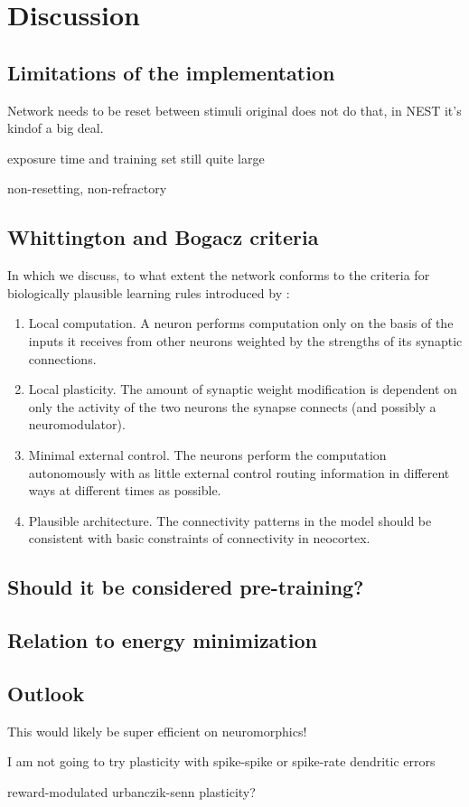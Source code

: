 
\chapter{Discussion}


\section{Limitations of the implementation}

Network needs to be reset between stimuli
original does not do that, in NEST it's kindof a big deal.

exposure time and training set still quite large

non-resetting, non-refractory


\section{Whittington and Bogacz criteria}

In which we discuss, to what extent the network conforms to the criteria for biologically plausible learning rules
introduced by \cite{Whittington2017}:
\begin{enumerate}
    \item Local computation. A neuron performs computation only on the basis
          of the inputs it receives from other neurons weighted by the strengths
          of its synaptic connections.
    \item  Local plasticity. The amount of synaptic weight modification is dependent on only the activity of the two
          neurons the synapse connects (and possibly a neuromodulator).
    \item  Minimal external control. The neurons perform the computation autonomously with as little external control
          routing information in different ways at different times as possible.
    \item   Plausible architecture. The connectivity patterns in the model should
          be consistent with basic constraints of connectivity in neocortex.
\end{enumerate}

\section{Should it be considered pre-training?}



\section{Relation to energy minimization}

\section{Outlook}

This would likely be super efficient on neuromorphics!

I am not going to try plasticity with spike-spike or spike-rate dendritic errors



reward-modulated urbanczik-senn plasticity?

